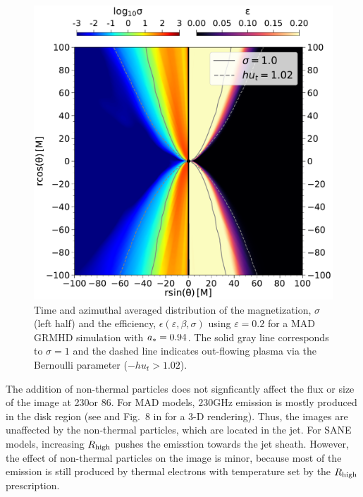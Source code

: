 \begin{figure}[t!]
  \centering
  \includegraphics[width=\columnwidth]{./figures/GRMHDphiavera0.94sigmaeta.pdf}
  \caption{Time and azimuthal averaged distribution of the magnetization, $\sigma$ (left half) and the efficiency, $\epsilon(\varepsilon,\beta,\sigma)$ using $\varepsilon=0.2 $ for a \bhac MAD GRMHD simulation with $a_*=0.94$. The solid gray line corresponds to $\sigma=1$ and the dashed line indicates out-flowing plasma via the Bernoulli parameter ($-h u_{t}>1.02$).
  }
  \label{fig:varepsilon}
\end{figure}

The addition of non-thermal particles does not signficantly affect the flux or size of the image at 230\GHz or 86\GHz. For MAD models, $230$GHz emission is mostly produced in the disk region (see  and Fig.~8 in \citealt{Wong_2022} for a 3-D rendering).  Thus, the images are unaffected by the non-thermal particles, which are located in the jet. For SANE models, increasing $R_\mathrm{high}$ pushes the emisstion towards the jet sheath. However, the effect of non-thermal particles on the image is minor, because most of the emission is still produced by thermal electrons with temperature set by the $R_\mathrm{high}$ prescription.


